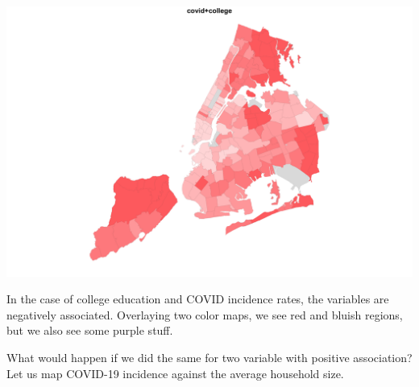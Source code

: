 \documentclass[
  openany]{book}
\newenvironment{Shaded}{\begin{snugshade}}{\end{snugshade}}
\newcommand{\AttributeTok}[1]{\textcolor[rgb]{0.77,0.63,0.00}{#1}}
\newcommand{\DecValTok}[1]{\textcolor[rgb]{0.00,0.00,0.81}{#1}}
\newcommand{\FloatTok}[1]{\textcolor[rgb]{0.00,0.00,0.81}{#1}}
\newcommand{\FunctionTok}[1]{\textcolor[rgb]{0.00,0.00,0.00}{#1}}
\newcommand{\NormalTok}[1]{#1}
\newcommand{\OtherTok}[1]{\textcolor[rgb]{0.56,0.35,0.01}{#1}}
\newcommand{\SpecialCharTok}[1]{\textcolor[rgb]{0.00,0.00,0.00}{#1}}
\newcommand{\StringTok}[1]{\textcolor[rgb]{0.31,0.60,0.02}{#1}}
\begin{document}
\begin{center}\includegraphics[width=0.9\linewidth]{carpedatum_files/figure-html/unnamed-chunk-96-3} \end{center}

In the case of college education and COVID incidence rates, the variables are negatively associated. Overlaying two color maps, we see red and bluish regions, but we also see some purple stuff.

What would happen if we did the same for two variable with positive association? Let us map COVID-19 incidence against the average household size.

\begin{Shaded}
\end{Shaded}
\end{document}
